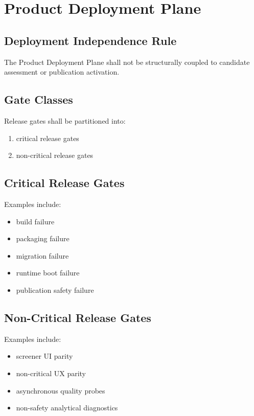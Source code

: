 \chapter{Product Deployment Plane}
\section{Deployment Independence Rule}
The Product Deployment Plane shall not be structurally coupled to candidate assessment or publication activation.

\section{Gate Classes}
Release gates shall be partitioned into:
\begin{enumerate}[leftmargin=1.2cm]
    \item critical release gates
    \item non-critical release gates
\end{enumerate}

\section{Critical Release Gates}
Examples include:
\begin{itemize}
    \item build failure
    \item packaging failure
    \item migration failure
    \item runtime boot failure
    \item publication safety failure
\end{itemize}

\section{Non-Critical Release Gates}
Examples include:
\begin{itemize}
    \item screener UI parity
    \item non-critical UX parity
    \item asynchronous quality probes
    \item non-safety analytical diagnostics
\end{itemize}
